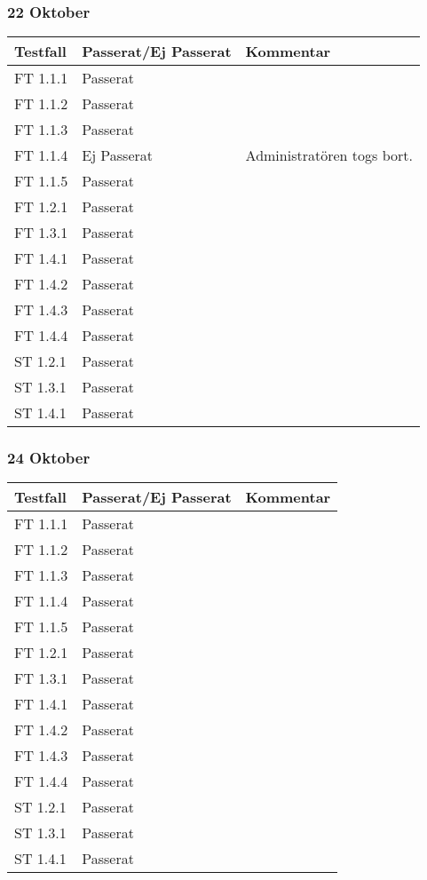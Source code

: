 \documentclass[a4paper]{article}
\begin{document}
\subsubsection{22 Oktober}
\begin{tabular}{| l | l | p{9cm} |}
\hline
Testfall & Passerat/Ej Passerat & Kommentar\\
\hline
FT 1.1.1 & Passerat & \\
\hline
FT 1.1.2 & Passerat & \\
\hline
FT 1.1.3 & Passerat & \\
\hline
FT 1.1.4 & Ej Passerat & Administratören togs bort.\\
\hline
FT 1.1.5 & Passerat & \\
\hline
FT 1.2.1 & Passerat & \\
\hline
FT 1.3.1 & Passerat & \\
\hline
FT 1.4.1 & Passerat & \\
\hline
FT 1.4.2 & Passerat & \\
\hline
FT 1.4.3 & Passerat & \\
\hline
FT 1.4.4 & Passerat & \\
\hline
ST 1.2.1 & Passerat & \\
\hline
ST 1.3.1 & Passerat & \\
\hline
ST 1.4.1 & Passerat & \\
\hline
\end{tabular}

\subsubsection{24 Oktober}
\begin{tabular}{| l | l | p{9cm} |}
\hline
Testfall & Passerat/Ej Passerat & Kommentar\\
\hline
FT 1.1.1 & Passerat & \\
\hline
FT 1.1.2 & Passerat & \\
\hline
FT 1.1.3 & Passerat & \\
\hline
FT 1.1.4 & Passerat & \\
\hline
FT 1.1.5 & Passerat & \\
\hline
FT 1.2.1 & Passerat & \\
\hline
FT 1.3.1 & Passerat & \\
\hline
FT 1.4.1 & Passerat & \\
\hline
FT 1.4.2 & Passerat & \\
\hline
FT 1.4.3 & Passerat & \\
\hline
FT 1.4.4 & Passerat & \\
\hline
ST 1.2.1 & Passerat & \\
\hline
ST 1.3.1 & Passerat & \\
\hline
ST 1.4.1 & Passerat & \\
\hline
\end{tabular}
\end{document}
